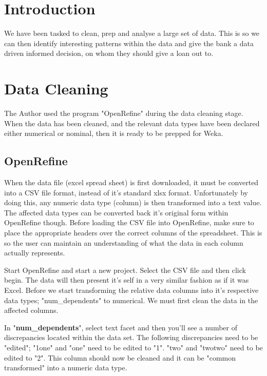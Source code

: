 \documentclass[12pt, a4paper]{article}
\title{\mytitle}
\author{\myauthor\hspace{1em}\\\contact\\Edinburgh Napier University\hspace{0.5em}-\hspace{0.5em}\mymodule}
\date{}
\begin{document}
    \maketitle
    
    \section{Introduction}
    
    We have been tasked to clean, prep and analyse a large set of data. This is so we can then identify interesting patterns within the data and give the bank a data driven informed decision, on whom they should give a loan out to.
    
    \section{Data Cleaning}
    The Author used the program "OpenRefine" during the data cleaning stage. When the data has been cleaned, and the relevant data types have been declared either numerical or nominal, then it is ready to be prepped for Weka.
    
    \subsection{OpenRefine}
    
    When the data file (excel spread sheet) is first downloaded, it must be converted into a CSV file format, instead of it's standard xlsx format. Unfortunately by doing this, any numeric data type (column) is then transformed into a text value. The affected data types can be converted back it's original form within OpenRefine though. Before loading the CSV file into OpenRefine, make sure to place the appropriate headers over the correct columns of the spreadsheet. This is so the user can maintain an understanding of what the data in each column actually represents.
  
    Start OpenRefine and start a new project. Select the CSV file and then click begin. The data will then present it's self in a very similar fashion as if it was Excel. Before we start transforming the relative data columns into it's respective data types; "num\_dependents" to numerical. We must first clean the data in the affected columns.

    In "\textbf{num\_dependents}", select text facet and then you'll see a number of discrepancies located within the data set. The following discrepancies need to be "edited"; "1one" and "one" need to be edited to "1". "two" and "twotwo" need to be edited to "2". This column should now be cleaned and it can be "common transformed" into a numeric data type.
    
\end{document}
